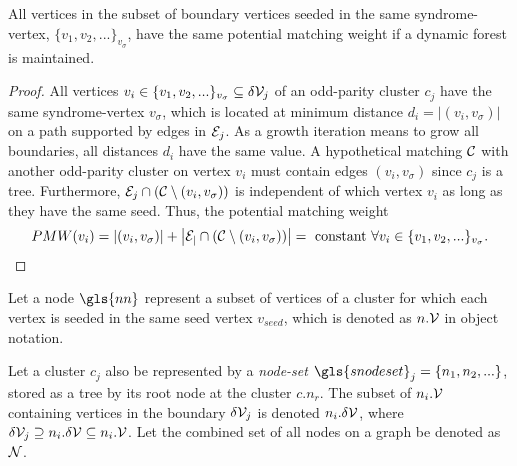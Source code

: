 \begin{theorem}\label{the:nodepmw}
  All vertices in the subset of boundary vertices seeded in the same syndrome-vertex, $ \{v_1, v_2,...\}_{v_\sigma}$, have the same potential matching weight if a dynamic forest is maintained. 
\end{theorem}
\begin{proof}
  All vertices $v_i \in \{v_1, v_2,...\}_{v_\sigma} \subseteq \delta\mathcal{V}_j$ of an odd-parity cluster $c_j$ have the same syndrome-vertex $v_\sigma$, which is located at minimum distance $d_i = |(v_i, v_\sigma)|$ on a path supported by edges in $\mathcal{E}_j$. As a growth iteration means to grow all boundaries, all distances $d_i$ have the same value. A hypothetical matching $\mathcal{C}$ with another odd-parity cluster on vertex $v_i$ must contain edges $(v_i, v_\sigma)$ since $c_j$ is a tree. Furthermore, $\mathcal{E}_j\cap (\mathcal{C} \setminus (v_i, v_\sigma))$ is independent of which vertex $v_i$ as long as they have the same seed. Thus, the potential matching weight
  \begin{equation}
    PMW(v_i) = \abs{(v_i, v_\sigma)} + \abs{\mathcal{E_j}\cap (\mathcal{C} \setminus (v_i, v_\sigma))} = \text{ constant } \forall v_i \in \{v_1, v_2,...\}_{v_\sigma}. 
  \end{equation}
\end{proof}

\begin{definition}\label{def:node}
  Let a node $\gls{nn}$ represent a subset of vertices of a cluster for which each vertex is seeded in the same seed vertex $v_{seed}$, which is denoted as $n.\mathcal{V}$ in object notation. 
\end{definition}

\begin{definition}\label{def:nodeset}
  Let a cluster $c_j$ also be represented by a \emph{node-set} $\gls{snodeset}_j = \{n_1, n_2, ...\}$, stored as a tree by its root node at the cluster $c.n_r$. The subset of $n_i.\mathcal{V}$ containing vertices in the boundary $\delta\mathcal{V}_j$ is denoted $n_i.\delta\mathcal{V}$, where $\delta\mathcal{V}_j \supseteq n_i.\delta\mathcal{V} \subseteq n_i.\mathcal{V}$. Let the combined set of all nodes on a graph be denoted as $\mathcal{N}$.
\end{definition}

